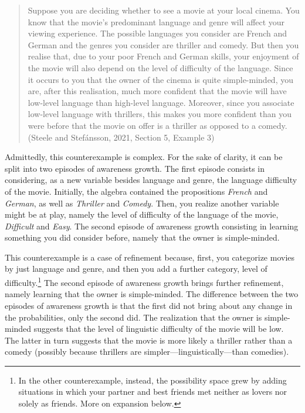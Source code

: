 \documentclass[
  11pt,
  dvipsnames,enabledeprecatedfontcommands]{scrartcl}
\begin{document}
\begin{quote}
Suppose you are deciding whether to see a movie at your local cinema.
You know that the movie's predominant language and genre will affect
your viewing experience. The possible languages you consider are French
and German and the genres you consider are thriller and comedy. But then
you realise that, due to your poor French and German skills, your
enjoyment of the movie will also depend on the level of difficulty of
the language. Since it occurs to you that the owner of the cinema is
quite simple-minded, you are, after this realisation, much more
confident that the movie will have low-level language than high-level
language. Moreover, since you associate low-level language with
thrillers, this makes you more confident than you were before that the
movie on offer is a thriller as opposed to a comedy. (Steele and
Stefánsson, 2021, Section 5, Example 3)
\end{quote}

\noindent Admittedly, this counterexample is complex. For the sake of
clarity, it can be split into two episodes of awareness growth. The
first episode consists in considering, as a new variable besides
language and genre, the language difficulty of the movie. Initially, the
algebra contained the propositions \textit{French} and \textit{German},
as well as \textit{Thriller} and \textit{Comedy}. Then, you realize
another variable might be at play, namely the level of difficulty of the
language of the movie, \textit{Difficult} and \textit{Easy}. The second
episode of awareness growth consisting in learning something you did
consider before, namely that the owner is simple-minded.

This counterexample is a case of refinement because, first, you
categorize movies by just language and genre, and then you add a further
category, level of difficulty.\footnote{In the other counterexample,
  instead, the possibility space grew by adding situations in which your
  partner and best friends met neither as lovers nor solely as friends.
  More on expansion below.} The second episode of awareness growth
brings further refinement, namely learning that the owner is
simple-minded. The difference between the two episodes of awareness
growth is that the first did not bring about any change in the
probabilities, only the second did. The realization that the owner is
simple-minded suggests that the level of linguistic difficulty of the
movie will be low. The latter in turn suggests that the movie is more
likely a thriller rather than a comedy (possibly because thrillers are
simpler---linguistically---than comedies).
\end{document}
